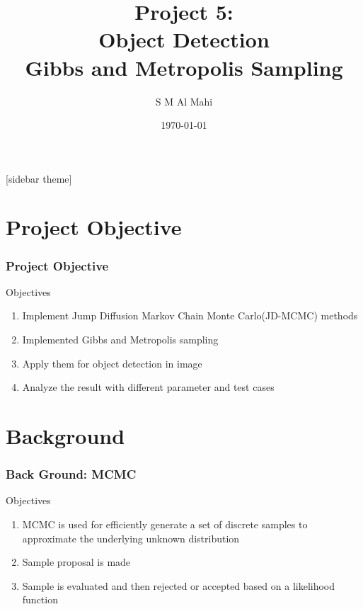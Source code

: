 \documentclass[11pt]{beamer}
\author{S M Al Mahi}
\title[ECEN-5283 Computer Vision]{Project 5: \\Object Detection\\Gibbs and Metropolis Sampling}
\institute{Oklahoma State University}
\date{\today}
\begin{document}
\begin{frame}
\titlepage
\end{frame}

\newpage

[sidebar theme]
\section{Project Objective}
\begin{frame}
\frametitle{Project Objective}
	\begin{block}{Objectives}
	\begin{enumerate}
		\item Implement Jump Diffusion Markov Chain Monte Carlo(JD-MCMC) methods
    \item Implemented Gibbs and Metropolis sampling
		\item Apply them for object detection in image
		\item Analyze the result with different parameter and test cases
	\end{enumerate}
	\end{block}
\end{frame}


\section{Background}
\begin{frame}
\frametitle{Back Ground: MCMC}
	\begin{block}{Objectives}
	\begin{enumerate}
		\item MCMC is used for efficiently generate a set of discrete samples to approximate the underlying unknown distribution
    	\item Sample proposal is made
		\item Sample is evaluated and then rejected or accepted based on a likelihood  function
	\end{enumerate}
	\end{block}
\end{frame}
\end{document}
